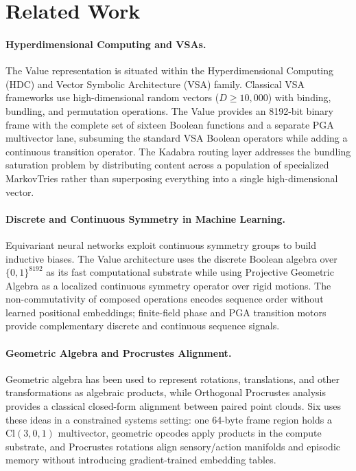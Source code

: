 \section{Related Work}

\paragraph{Hyperdimensional Computing and VSAs.}
The Value representation is situated within the Hyperdimensional
Computing (HDC) and Vector Symbolic Architecture (VSA) family.  Classical
VSA frameworks use high-dimensional random vectors ($D \ge 10{,}000$)
with binding, bundling, and permutation operations.  The Value provides
an 8192-bit binary frame with the complete set of sixteen Boolean
functions and a separate PGA multivector lane, subsuming the standard
VSA Boolean operators while adding a continuous transition operator.
The Kadabra routing layer
addresses the bundling saturation problem by distributing content across
a population of specialized MarkovTries rather than superposing
everything into a single high-dimensional vector.

\paragraph{Discrete and Continuous Symmetry in Machine Learning.}
Equivariant neural networks exploit continuous symmetry groups to build
inductive biases.  The Value architecture uses the discrete Boolean
algebra over $\{0,1\}^{8192}$ as its fast computational substrate while
using Projective Geometric Algebra as a localized continuous symmetry
operator over rigid motions.  The non-commutativity of composed
operations encodes sequence order without learned positional embeddings;
finite-field phase and PGA transition motors provide complementary
discrete and continuous sequence signals.

\paragraph{Geometric Algebra and Procrustes Alignment.}
Geometric algebra has been used to represent rotations, translations,
and other transformations as algebraic products, while Orthogonal
Procrustes analysis provides a classical closed-form alignment between
paired point clouds.  Six uses these ideas in a constrained systems
setting: one 64-byte frame region holds a $\mathrm{Cl}(3,0,1)$
multivector, geometric opcodes apply products in the compute substrate,
and Procrustes rotations align sensory/action manifolds and episodic
memory without introducing gradient-trained embedding tables.

